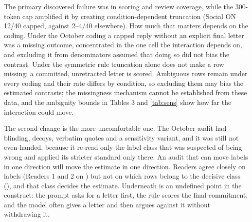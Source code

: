 \documentclass[10pt]{article}
\begin{document}
The primary discovered failure was in scoring and review coverage, while the 300-token cap amplified it by creating condition-dependent truncation (Social ON 12/40 capped, against 2--4/40 elsewhere). How much that matters depends on the coding. Under the October coding a capped reply without an explicit final letter was a missing outcome, concentrated in the one cell the interaction depends on, and excluding it from denominators assumed that doing so did not bias the contrast. Under the symmetric rule truncation alone does not make a row missing: a committed, unretracted letter is scored. Ambiguous rows remain under every coding and their rate differs by condition, so excluding them may bias the estimated contrasts; the missingness mechanism cannot be established from these data, and the ambiguity bounds in Tables 3 and \ref{tab:sens} show how far the interaction could move.

The second change is the more uncomfortable one. The October audit had blinding, decoys, verbatim quotes and a sensitivity variant, and it was still not even-handed, because it re-read only the label class that was suspected of being wrong and applied its stricter standard only there. An audit that can move labels in one direction will move the estimate in one direction. Readers agree closely on labels (Readers 1 and 2 on \SymAgreeOneTwo) but not on which rows belong to the decisive class (\SymUtwoOverlap), and that class decides the estimate. Underneath is an undefined point in the construct: the prompt asks for a letter first, the rule scores the final commitment, and the model often gives a letter and then argues against it without withdrawing it.
\end{document}
